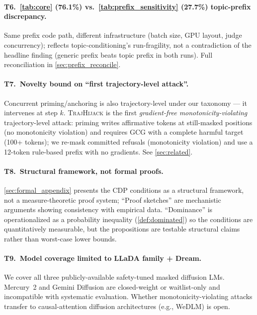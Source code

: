 \documentclass{article}
\theoremstyle{coloredthm}
\newcommand{\method}{\textsc{TrajHijack}}
\begin{document}
\paragraph{T6.\ \cref{tab:core} (76.1\%) vs.\ \cref{tab:prefix_sensitivity} (27.7\%) topic-prefix discrepancy.} Same prefix code path, different infrastructure (batch size, GPU layout, judge concurrency); reflects topic-conditioning's run-fragility, not a contradiction of the headline finding (generic prefix beats topic prefix in both runs). Full reconciliation in \cref{sec:prefix_reconcile}.

\paragraph{T7.\ Novelty bound on ``first trajectory-level attack''.} Concurrent priming/anchoring \citep{yamabe2026priming} is also trajectory-level under our taxonomy --- it intervenes at step $k$. \method{} is the first \emph{gradient-free monotonicity-violating} trajectory-level attack: priming writes affirmative tokens at still-masked positions (no monotonicity violation) and requires GCG with a complete harmful target (100+ tokens); we re-mask committed refusals (monotonicity violation) and use a 12-token rule-based prefix with no gradients. See \cref{sec:related}.

\paragraph{T8.\ Structural framework, not formal proofs.} \cref{sec:formal_appendix} presents the CDP conditions as a structural framework, not a measure-theoretic proof system; ``Proof sketches'' are mechanistic arguments showing consistency with empirical data. ``Dominance'' is operationalized as a probability inequality (\cref{def:dominated}) so the conditions are quantitatively measurable, but the propositions are testable structural claims rather than worst-case lower bounds.

\paragraph{T9.\ Model coverage limited to LLaDA family + Dream.} We cover all three publicly-available safety-tuned masked diffusion LMs. Mercury~2 and Gemini Diffusion are closed-weight or waitlist-only and incompatible with systematic evaluation. Whether monotonicity-violating attacks transfer to causal-attention diffusion architectures (e.g., WeDLM) is open.
\end{document}
